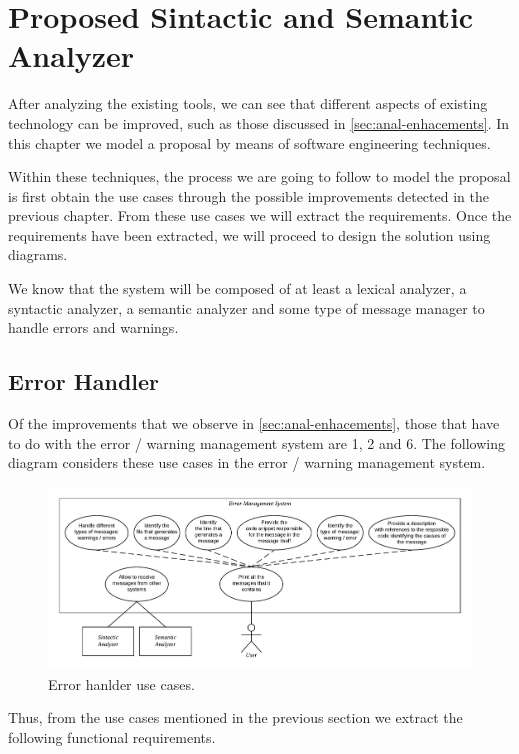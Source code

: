 \chapter{Proposed Sintactic and Semantic Analyzer}
\label{ch:proposed-sin-sema-anal}
After analyzing the existing tools, we can see that different
aspects of existing technology can be improved, such as those
discussed in \cref{sec:anal-enhacements}. In this chapter we
model a proposal by means of software engineering techniques.

Within these techniques, the process we are going to follow
to model the proposal is first obtain the use cases through
the possible improvements detected in the previous chapter.
From these use cases we will extract the requirements. Once
the requirements have been extracted, we will proceed to
design the solution using diagrams.

We know that the system will be composed of at least a lexical
analyzer, a syntactic analyzer, a semantic analyzer and some
type of message manager to handle errors and warnings.

\section{Error Handler}
Of the improvements that we observe in \cref{sec:anal-enhacements}, those
that have to do with the error / warning management
system are 1, 2 and 6. The following diagram considers
these use cases in the error / warning management system.

\begin{figure}[h!]
    \includegraphics[scale=0.6]{images/err-hand-use-case.pdf}
    \centering
    \caption[Error hanlder use cases]{Error hanlder use cases.}
    \label{fig:err-hand-use-case}
\end{figure}

Thus, from the use cases mentioned in the previous section we
extract the following functional requirements.


